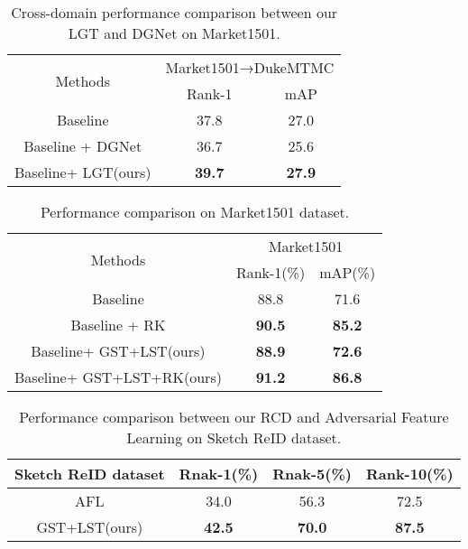 \documentclass[10pt,twocolumn,letterpaper]{article}
\begin{document}
\begin{table}[]
\centering 
	\setlength\tabcolsep{3pt}\caption{Cross-domain performance comparison between our LGT and DGNet on Market1501.}
	\begin{tabular}{cclcl}
		\hline
		\multirow{2}{*}{Methods} & \multicolumn{4}{c}{Market1501→DukeMTMC}                               \\ \cline{2-5} 
		& \multicolumn{2}{c}{Rank-1}        & \multicolumn{2}{c}{mAP}           \\ \hline
		Baseline\cite{zheng2018discriminatively}            & \multicolumn{2}{c}{37.8}          & \multicolumn{2}{c}{27.0}          \\ 
		Baseline + DGNet\cite{zheng2019joint}       & \multicolumn{2}{c}{{36.7}} & \multicolumn{2}{c}{{25.6}} \\ 
		Baseline+ LGT(ours) & \multicolumn{2}{c}{\textbf{39.7}} & \multicolumn{2}{c}{\textbf{27.9}} \\ \hline
	\end{tabular}
\end{table}

\begin{table}[]
\centering 
	\setlength\tabcolsep{3pt}\caption{Performance comparison on Market1501 dataset.}
	\begin{tabular}{cclcl}
		\hline
		\multirow{2}{*}{Methods}                            & \multicolumn{4}{c}{Market1501}                                        \\ \cline{2-5} 
		& \multicolumn{2}{c}{Rank-1(\%)}    & \multicolumn{2}{c}{mAP(\%)}       \\ \hline
		Baseline\cite{zheng2018discriminatively}                                       & \multicolumn{2}{c}{88.8}          & \multicolumn{2}{c}{71.6}          \\ 
		Baseline + RK\cite{re_ranking}                                  & \multicolumn{2}{c}{\textbf{90.5}} & \multicolumn{2}{c}{\textbf{85.2}} \\ 
		Baseline+ GST+LST(ours)                        & \multicolumn{2}{c}{\textbf{88.9}} & \multicolumn{2}{c}{\textbf{72.6}} \\ 
		\multicolumn{1}{l}{Baseline+ GST+LST+RK(ours)} & \multicolumn{2}{c}{\textbf{91.2}} & \multicolumn{2}{c}{\textbf{86.8}}  \\ \hline
	\end{tabular}
\end{table}

\begin{table}[]\small
\centering 
	\setlength\tabcolsep{2pt}\caption{Performance comparison between our RCD and Adversarial Feature Learning on Sketch ReID dataset.}
	\begin{tabular}{cccc}
		\hline
		Sketch ReID dataset          & Rnak-1(\%) & Rnak-5(\%) & Rank-10(\%) \\ \hline
		AFL\cite{sketch-criminal} & 34.0       & 56.3       & 72.5        \\ 
		GST+LST(ours)                & \textbf{42.5}      & \textbf{70.0}       & \textbf{87.5}        \\ \hline
	\end{tabular}
\end{table}
\end{document}
